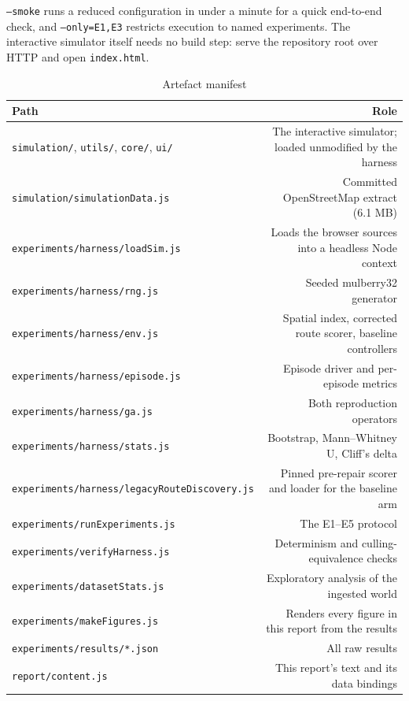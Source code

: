 \documentclass[conference]{IEEEtran}
\begin{document}
\texttt{--smoke} runs a reduced configuration in under a minute for a quick end-to-end check, and \texttt{--only=E1,E3} restricts execution to named experiments. The interactive simulator itself needs no build step: serve the repository root over HTTP and open \texttt{index.html}.

\begin{table}[!t]
\caption{Artefact manifest}
\label{tab:manifest}
\centering
\footnotesize
\begin{tabular}{lr}
\toprule
Path & Role \\
\midrule
\texttt{simulation/}, \texttt{utils/}, \texttt{core/}, \texttt{ui/} & The interactive simulator; loaded unmodified by the harness \\
\texttt{simulation/simulationData.js} & Committed OpenStreetMap extract (6.1 MB) \\
\texttt{experiments/harness/loadSim.js} & Loads the browser sources into a headless Node context \\
\texttt{experiments/harness/rng.js} & Seeded mulberry32 generator \\
\texttt{experiments/harness/env.js} & Spatial index, corrected route scorer, baseline controllers \\
\texttt{experiments/harness/episode.js} & Episode driver and per-episode metrics \\
\texttt{experiments/harness/ga.js} & Both reproduction operators \\
\texttt{experiments/harness/stats.js} & Bootstrap, Mann–Whitney U, Cliff's delta \\
\texttt{experiments/harness/legacyRouteDiscovery.js} & Pinned pre-repair scorer and loader for the baseline arm \\
\texttt{experiments/runExperiments.js} & The E1–E5 protocol \\
\texttt{experiments/verifyHarness.js} & Determinism and culling-equivalence checks \\
\texttt{experiments/datasetStats.js} & Exploratory analysis of the ingested world \\
\texttt{experiments/makeFigures.js} & Renders every figure in this report from the results \\
\texttt{experiments/results/*.json} & All raw results \\
\texttt{report/content.js} & This report's text and its data bindings \\
\bottomrule
\end{tabular}
\end{table}
\end{document}
